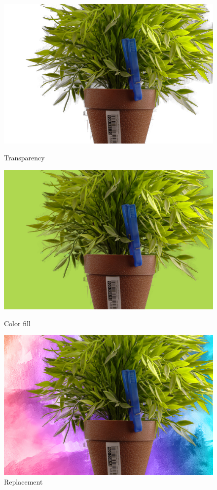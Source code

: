 \documentclass[a4paper]{article}
\begin{document}
\begin{figure}[h]
    \begin{minipage}{0.33\textwidth}
        \includegraphics[width=\textwidth]{results/result3.png}
        \caption{Transparency}
    \end{minipage}
    \begin{minipage}{0.33\textwidth}
        \includegraphics[width=\textwidth]{results/result2.png}
        \caption{Color fill}
    \end{minipage}
    \begin{minipage}{0.33\textwidth}
        \includegraphics[width=\textwidth]{results/result1.png}
        \caption{Replacement}
    \end{minipage}
\end{figure}
\end{document}
